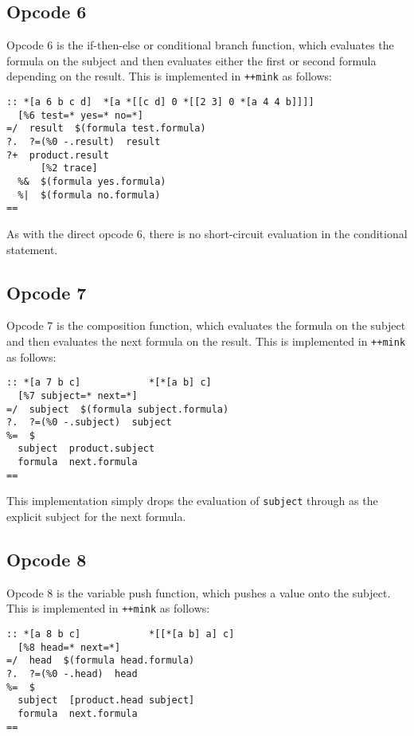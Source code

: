 \documentclass[twoside]{article}
\begin{document}
\subsection{Opcode 6}

Opcode 6 is the if-then-else or conditional branch function, which evaluates the formula on the subject and then evaluates either the first or second formula depending on the result.  This is implemented in \lstinline[style=inlinecode]{++mink} as follows:

\begin{lstlisting}[style=listingcode]
:: *[a 6 b c d]  *[a *[[c d] 0 *[[2 3] 0 *[a 4 4 b]]]]
  [%6 test=* yes=* no=*]
=/  result  $(formula test.formula)
?.  ?=(%0 -.result)  result
?+  product.result
      [%2 trace]
  %&  $(formula yes.formula)
  %|  $(formula no.formula)
==
\end{lstlisting}

\noindent
As with the direct opcode 6, there is no short-circuit evaluation in the conditional statement.

\subsection{Opcode 7}

Opcode 7 is the composition function, which evaluates the formula on the subject and then evaluates the next formula on the result.  This is implemented in \lstinline[style=inlinecode]{++mink} as follows:

\begin{lstlisting}[style=listingcode]
:: *[a 7 b c]            *[*[a b] c]
  [%7 subject=* next=*]
=/  subject  $(formula subject.formula)
?.  ?=(%0 -.subject)  subject
%=  $
  subject  product.subject
  formula  next.formula
==
\end{lstlisting}

\noindent
This implementation simply drops the evaluation of \lstinline[style=inlinecode]{subject} through as the explicit subject for the next formula.

\subsection{Opcode 8}

Opcode 8 is the variable push function, which pushes a value onto the subject.  This is implemented in \lstinline[style=inlinecode]{++mink} as follows:

\begin{lstlisting}[style=listingcode]
:: *[a 8 b c]            *[[*[a b] a] c]
  [%8 head=* next=*]
=/  head  $(formula head.formula)
?.  ?=(%0 -.head)  head
%=  $
  subject  [product.head subject]
  formula  next.formula
==
\end{lstlisting}
\end{document}
